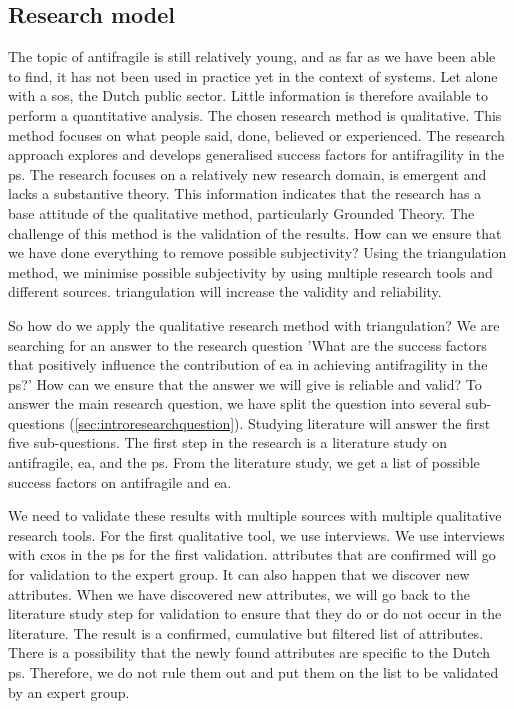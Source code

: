 \subsection{Research model}
\label{sec:researchmodel}
The topic of \gls{antifragile} is still relatively young, and as far as we have been able to find, it has not been used in practice yet in the context of systems. Let alone with a \acrlong{sos}, the Dutch public sector. Little information is therefore available to perform a quantitative analysis. The chosen research method is qualitative. This method focuses on what people said, done, believed or experienced. The research approach explores and develops generalised success factors for \gls{antifragility} in the \gls{ps}. The research focuses on a relatively new research domain, is emergent and lacks a substantive theory. This information indicates that the research has a base attitude of the qualitative method, particularly Grounded Theory. The challenge of this method is the validation of the results. How can we ensure that we have done everything to remove possible subjectivity? Using the triangulation method, we minimise possible subjectivity by using multiple research tools and different sources. \Gls{triangulation} will increase the validity and reliability.

So how do we apply the qualitative research method with triangulation? We are searching for an answer to the research question 'What are the success factors that positively influence the contribution of \acrlong{ea} in achieving \gls{antifragility} in the \gls{ps}?' How can we ensure that the answer we will give is reliable and valid? To answer the main research question, we have split the question into several sub-questions (\cref{sec:introresearchquestion}). Studying literature will answer the first five sub-questions. The first step in the research is a literature study on \gls{antifragile}, \acrlong{ea}, and the \gls{ps}. From the literature study, we get a list of possible success factors on \gls{antifragile} and \acrlong{ea}.

We need to validate these results with multiple sources with multiple qualitative research tools. For the first qualitative tool, we use interviews. We use interviews with \glspl{cxo} in the \gls{ps} for the first validation. \Glspl{attribute} that are confirmed will go for validation to the expert group. It can also happen that we discover new \glspl{attribute}. When we have discovered new \glspl{attribute}, we will go back to the literature study step for validation to ensure that they do or do not occur in the literature. The result is a confirmed, cumulative but filtered list of \glspl{attribute}. There is a possibility that the newly found \glspl{attribute} are specific to the Dutch \gls{ps}. Therefore, we do not rule them out and put them on the list to be validated by an expert group.

